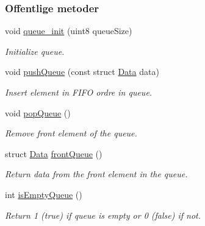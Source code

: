 \subsubsection*{Offentlige metoder}
\begin{DoxyCompactItemize}
\item 
void \hyperlink{class_queue_a2f53f032b89a2e6f1906a3d7aef99df3}{queue\+\_\+init} (uint8 queue\+Size)
\begin{DoxyCompactList}\small\item\em Initialize queue. \end{DoxyCompactList}\item 
void \hyperlink{class_queue_a0a8b5d336192563403043ec13ab653db}{push\+Queue} (const struct \hyperlink{queue_8h_da/d48/struct_data}{Data} data)
\begin{DoxyCompactList}\small\item\em Insert element in F\+I\+FO ordre in queue. \end{DoxyCompactList}\item 
void \hyperlink{class_queue_a9ecab9ecdedfc331aed9a0ae63ce193b}{pop\+Queue} ()
\begin{DoxyCompactList}\small\item\em Remove front element of the queue. \end{DoxyCompactList}\item 
struct \hyperlink{queue_8h_da/d48/struct_data}{Data} \hyperlink{class_queue_ad9db61946726aa012867eb9947a4597b}{front\+Queue} ()
\begin{DoxyCompactList}\small\item\em Return data from the front element in the queue. \end{DoxyCompactList}\item 
int \hyperlink{class_queue_a0a59d535179c225aa8a08eab5967e80b}{is\+Empty\+Queue} ()
\begin{DoxyCompactList}\small\item\em Return 1 (true) if queue is empty or 0 (false) if not. \end{DoxyCompactList}\end{DoxyCompactItemize}
